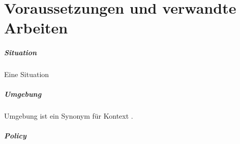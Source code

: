 \chapter{Voraussetzungen und verwandte Arbeiten}
\label{cha:requirements_and_related_work}





\paragraph{Situation}
Eine Situation 
\paragraph{Umgebung}
Umgebung ist ein Synonym für Kontext \cite{abowd_towards_1999}.

\paragraph{Policy}

